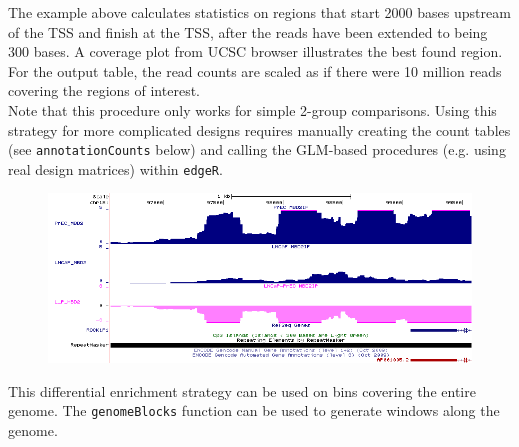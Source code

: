 \noindent The example above calculates statistics on regions that start 2000 bases upstream of the TSS and finish at the TSS, after the reads have been extended to being 300 bases. A coverage plot from UCSC browser illustrates the best found region.  For the output table, the read counts are scaled as if there were 10 million reads covering the regions of interest. \\

\noindent Note that this procedure only works for simple 2-group comparisons.  Using this strategy for more complicated designs requires manually creating the count tables (see \texttt{annotationCounts} below) and calling the GLM-based procedures (e.g. using real design matrices) within \texttt{edgeR}. \\


\begin{figure}[!h]
    \begin{center}
        \includegraphics{rock1.png}
    \end{center}
\end{figure}

This differential enrichment strategy can be used on bins covering the entire genome.  The \texttt{genomeBlocks} function can be used to generate windows along the genome.
